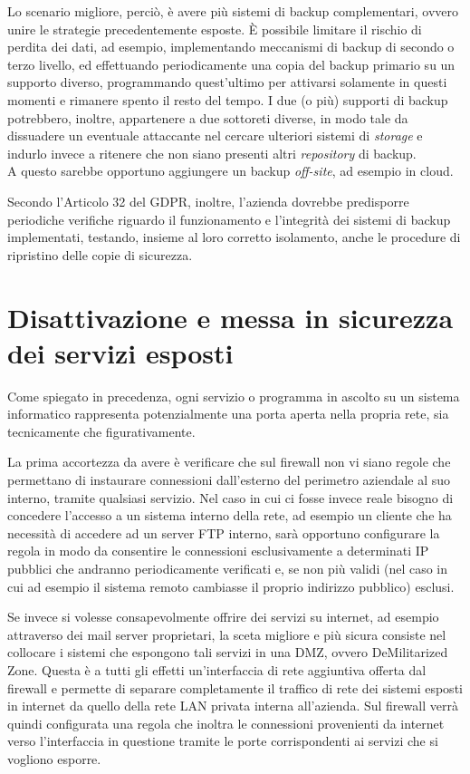 \documentclass[target=bach,aauheader=]{thud}
\begin{document}
Lo scenario migliore, perciò, è avere più sistemi di backup complementari, ovvero unire le strategie precedentemente esposte. È possibile limitare il rischio di perdita dei dati, ad esempio, implementando meccanismi di backup di secondo o terzo livello, ed effettuando periodicamente una copia del backup primario su un supporto diverso, programmando quest'ultimo per attivarsi solamente in questi momenti e rimanere spento il resto del tempo. I due (o più) supporti di backup potrebbero, inoltre, appartenere a due sottoreti diverse, in modo tale da dissuadere un eventuale attaccante nel cercare ulteriori sistemi di \textit{storage} e indurlo invece a ritenere che non siano presenti altri \textit{repository} di backup.
\\ A questo sarebbe opportuno aggiungere un backup \textit{off-site}, ad esempio in cloud.

Secondo l'Articolo 32 del GDPR, inoltre, l'azienda dovrebbe predisporre periodiche verifiche riguardo il funzionamento e l'integrità dei sistemi di backup implementati, testando, insieme al loro corretto isolamento, anche le procedure di ripristino delle copie di sicurezza.

\section{Disattivazione e messa in sicurezza dei servizi esposti}

Come spiegato in precedenza, ogni servizio o programma in ascolto su un sistema informatico rappresenta potenzialmente una porta aperta nella propria rete, sia tecnicamente che figurativamente.

La prima accortezza da avere è verificare che sul firewall non vi siano regole che permettano di instaurare connessioni dall'esterno del perimetro aziendale al suo interno, tramite qualsiasi servizio. Nel caso in cui ci fosse invece reale bisogno di concedere l'accesso a un sistema interno della rete, ad esempio un cliente che ha necessità di accedere ad un server FTP interno, sarà opportuno configurare la regola in modo da consentire le connessioni esclusivamente a determinati IP pubblici che andranno periodicamente verificati e, se non più validi (nel caso in cui ad esempio il sistema remoto cambiasse il proprio indirizzo pubblico) esclusi.

Se invece si volesse consapevolmente offrire dei servizi su internet, ad esempio attraverso dei mail server proprietari, la sceta migliore e più sicura consiste nel collocare i sistemi che espongono tali servizi in una DMZ, ovvero DeMilitarized Zone. Questa è a tutti gli effetti un'interfaccia di rete aggiuntiva offerta dal firewall e permette di separare completamente il traffico di rete dei sistemi esposti in internet da quello della rete LAN privata interna all'azienda. Sul firewall verrà quindi configurata una regola che inoltra le connessioni provenienti da internet verso l'interfaccia in questione tramite le porte corrispondenti ai servizi che si vogliono esporre.
\end{document}
